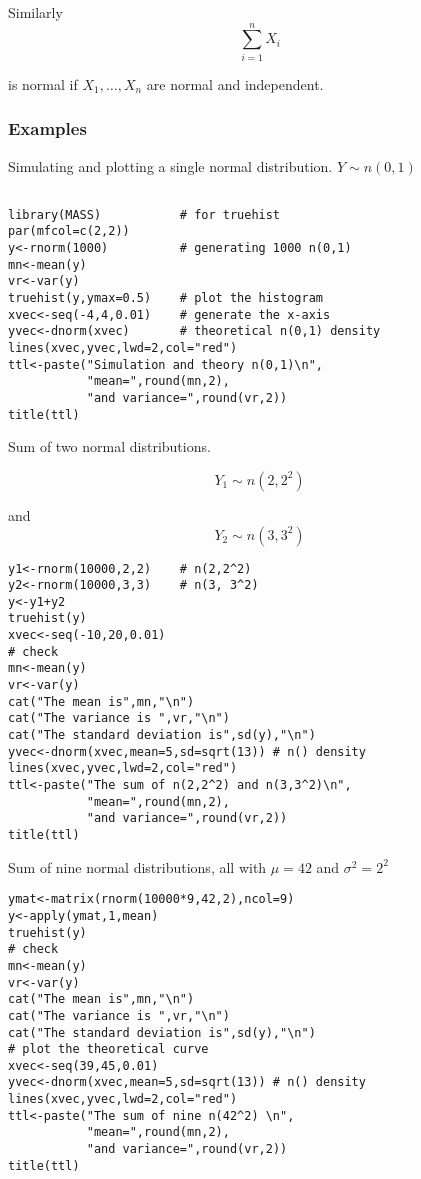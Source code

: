 \documentclass[12pt,a4paper]{article}
\theoremstyle{regla}
\theoremstyle{remark}
\theoremstyle{definition}
\theoremstyle{nonumberbreak}
\begin{document}
Similarly $$\sum_{i=1}^{n} X_i $$

is normal if $X_1 , \ldots , X_n$ are normal and independent.
\subsubsection{Examples}
\begin{xmpl}
Simulating and plotting a single normal distribution.
$Y \sim n(0,1)$

\begin{lstlisting}

library(MASS)           # for truehist
par(mfcol=c(2,2))       
y<-rnorm(1000)          # generating 1000 n(0,1)
mn<-mean(y)
vr<-var(y)
truehist(y,ymax=0.5)    # plot the histogram
xvec<-seq(-4,4,0.01)    # generate the x-axis
yvec<-dnorm(xvec)       # theoretical n(0,1) density
lines(xvec,yvec,lwd=2,col="red")
ttl<-paste("Simulation and theory n(0,1)\n",
           "mean=",round(mn,2),
           "and variance=",round(vr,2))
title(ttl)
\end{lstlisting}
\end{xmpl}
\begin{xmpl}

Sum of two normal distributions.

$$Y_1 \sim n(2, 2^2)$$

and  $$Y_2 \sim n(3, 3^2)$$

\begin{lstlisting}
y1<-rnorm(10000,2,2)    # n(2,2^2)
y2<-rnorm(10000,3,3)    # n(3, 3^2)
y<-y1+y2
truehist(y)
xvec<-seq(-10,20,0.01)
# check
mn<-mean(y)
vr<-var(y)
cat("The mean is",mn,"\n")
cat("The variance is ",vr,"\n")
cat("The standard deviation is",sd(y),"\n")
yvec<-dnorm(xvec,mean=5,sd=sqrt(13)) # n() density
lines(xvec,yvec,lwd=2,col="red")
ttl<-paste("The sum of n(2,2^2) and n(3,3^2)\n",
           "mean=",round(mn,2),
           "and variance=",round(vr,2))
title(ttl)
\end{lstlisting}
\end{xmpl}
\begin{xmpl}
Sum of nine normal distributions, all with $\mu = 42$ and $\sigma^2=2^2$


\begin{lstlisting}
ymat<-matrix(rnorm(10000*9,42,2),ncol=9)
y<-apply(ymat,1,mean)
truehist(y)
# check
mn<-mean(y)
vr<-var(y)
cat("The mean is",mn,"\n")
cat("The variance is ",vr,"\n")
cat("The standard deviation is",sd(y),"\n")
# plot the theoretical curve
xvec<-seq(39,45,0.01)
yvec<-dnorm(xvec,mean=5,sd=sqrt(13)) # n() density
lines(xvec,yvec,lwd=2,col="red")
ttl<-paste("The sum of nine n(42^2) \n",
           "mean=",round(mn,2),
           "and variance=",round(vr,2))
title(ttl)
\end{lstlisting}
\end{xmpl}
\end{document}
